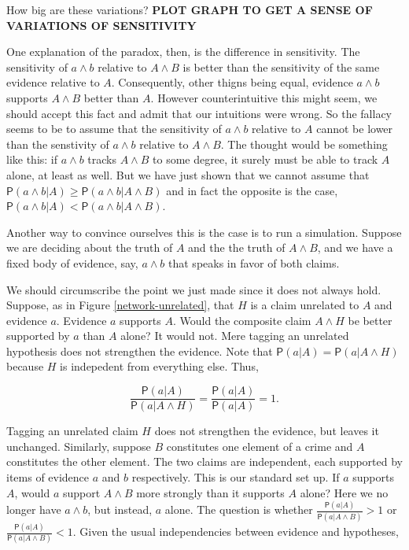 \documentclass[
  10pt,
  dvipsnames,enabledeprecatedfontcommands]{scrartcl}
\newcommand{\pr}[1]{\mathsf{P}(#1)}
\begin{document}
How big are these variations?
\textbf{PLOT GRAPH TO GET A SENSE OF VARIATIONS OF SENSITIVITY}

One explanation of the paradox, then, is the difference in sensitivity.
The sensitivity of \(a\wedge b\) relative to \(A\wedge B\) is better
than the sensitivity of the same evidence relative to \(A\).
Consequently, other thigns being equal, evidence \(a\wedge b\) supports
\(A\wedge B\) better than \(A\). However counterintuitive this might
seem, we should accept this fact and admit that our intuitions were
wrong. So the fallacy seems to be to assume that the sensitivity of
\(a\wedge b\) relative to \(A\) cannot be lower than the senstivity of
\(a\wedge b\) relative to \(A\wedge B\). The thought would be something
like this: if \(a \wedge b\) tracks \(A\wedge B\) to some degree, it
surely must be able to track \(A\) alone, at least as well. But we have
just shown that we cannot assume that
\(\pr{a\wedge b \vert A} \geq \pr{a\wedge b \vert A\wedge B}\) and in
fact the opposite is the case,
\(\pr{a\wedge b \vert A} < \pr{a\wedge b \vert A\wedge B}\).

Another way to convince ourselves this is the case is to run a
simulation. Suppose we are deciding about the truth of \(A\) and the the
truth of \(A\wedge B\), and we have a fixed body of evidence, say,
\(a\wedge b\) that speaks in favor of both claims.

We should circumscribe the point we just made since it does not always
hold. Suppose, as in Figure \ref{network-unrelated}, that \(H\) is a
claim unrelated to \(A\) and evidence \(a\). Evidence \(a\) supports
\(A\). Would the composite claim \(A\wedge H\) be better supported by
\(a\) than \(A\) alone? It would not. Mere tagging an unrelated
hypothesis does not strengthen the evidence. Note that
\(\pr{a \vert A}=\pr{a \vert A \wedge H}\) because \(H\) is indepedent
from everything else. Thus,

\[\frac{\pr{a \vert A}}{\pr{a \vert A \wedge H}}=\frac{\pr{a \vert A}}{\pr{a \vert A}}=1.\]

\noindent Tagging an unrelated claim \(H\) does not strengthen the
evidence, but leaves it unchanged. Similarly, suppose \(B\) constitutes
one element of a crime and \(A\) constitutes the other element. The two
claims are independent, each supported by items of evidence \(a\) and
\(b\) respectively. This is our standard set up. If \(a\) supports
\(A\), would \(a\) support \(A\wedge B\) more strongly than it supports
\(A\) alone? Here we no longer have \(a\wedge b\), but instead, \(a\)
alone. The question is whether
\(\frac{\pr{a \vert A}}{\pr{a \vert A \wedge B}}>1\) or
\(\frac{\pr{a \vert A}}{\pr{a \vert A \wedge B}}<1\). Given the usual
independencies between evidence and hypotheses,
\end{document}
